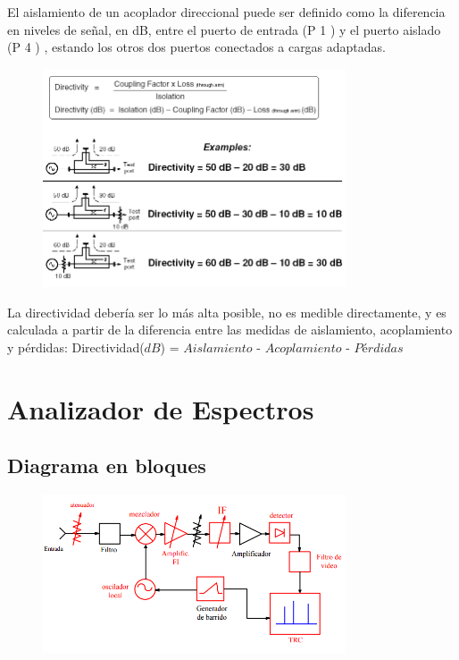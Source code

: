 \documentclass[a4paper,12pt,twoside]{article}
\begin{document}
El aislamiento de un acoplador direccional puede ser definido como la diferencia en niveles de
señal, en dB, entre el puerto de entrada (P 1 ) y el puerto aislado (P 4 ) , estando los otros dos
puertos conectados a cargas adaptadas.

\begin{figure}[H]
    \centering
    \includegraphics[width=0.8\textwidth]{../img/acople_direccional4.png}
\end{figure}

La directividad debería ser lo más alta posible, no es medible directamente, y es
calculada a partir de la diferencia entre las medidas de aislamiento, acoplamiento y
pérdidas:
Directividad($dB$) = $Aislamiento$ - $Acoplamiento$ - $Pérdidas$

\section{Analizador de Espectros}

\subsection{Diagrama en bloques}
\begin{figure}[H]
    \centering
    \includegraphics[width=0.8\textwidth]{../img/analizador_espectro.png}
\end{figure}
\end{document}
